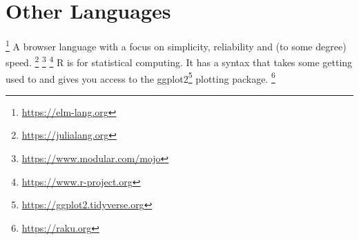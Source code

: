\section{Other Languages}

\begin{itemize}
  \footnote{\url{https://elm-lang.org}} A  browser language with a focus on simplicity, reliability and (to some degree) speed.
  \footnote{\url{https://julialang.org}}
  \footnote{\url{https://www.modular.com/mojo}}
  \footnote{\url{https://www.r-project.org}} R is for statistical computing. It has a syntax that takes some getting used to and gives you access to the ggplot2\footnote{\url{https://ggplot2.tidyverse.org}} plotting package.
  \footnote{\url{https://raku.org}}
\end{itemize}
